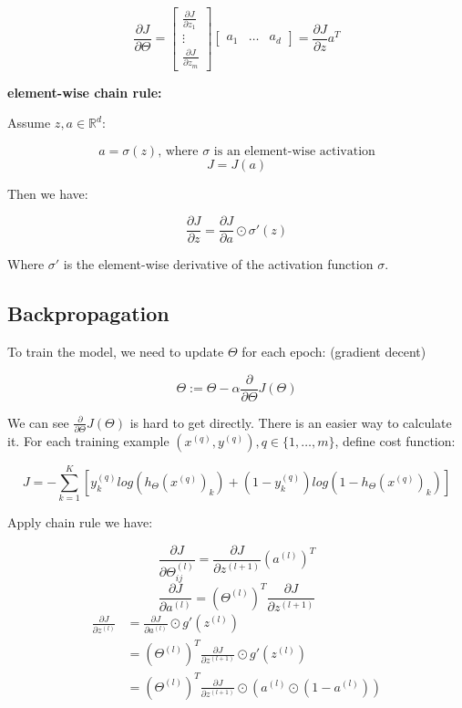 \documentclass{article}
\begin{document}
\[
\frac{\partial J}{\partial \Theta} = 
\begin{bmatrix}
\frac{\partial J}{\partial z_1}\\
\vdots\\
\frac{\partial J}{\partial z_m}
\end{bmatrix}
\begin{bmatrix}
a_1 & \dots & a_d
\end{bmatrix}
= \frac{\partial J}{\partial z} a^T
\]

\noindent \textbf{element-wise chain rule:}

\noindent Assume \(z, a \in \mathbb{R}^d\):

\[a = \sigma(z) \text{, where \(\sigma\) is an element-wise activation}\]
\[J = J(a)\]

\noindent Then we have:

\[\frac{\partial J}{\partial z} = \frac{\partial J}{\partial a} \odot \sigma'(z)\]

\noindent Where \(\sigma'\) is the element-wise derivative of the activation function \(\sigma\).

\subsection{Backpropagation}

\noindent To train the model, we need to update \(\Theta\) for each epoch: (gradient decent)

\[\Theta := \Theta - \alpha  \frac{\partial}{\partial \Theta} J(\Theta)\]

\noindent We can see \(\frac{\partial}{\partial \Theta} J(\Theta)\) is hard to get directly. There is an easier way to calculate it. For each training example \((x^{(q)}, y^{(q)}), q \in \{1, \dots, m\}\), define cost function:

\[J = -\sum_{k = 1}^{K} [y^{(q)}_k log(h_{\Theta} (x^{(q)})_k) + (1 - y^{(q)}_k) log(1 - h_{\Theta}(x^{(q)})_k)] \]

\noindent Apply chain rule we have:

\[\frac{\partial J}{\partial \Theta_{ij}^{(l)}} = \frac{\partial J}{\partial z^{(l + 1)}} (a^{(l)})^T\]
\[\frac{\partial J}{\partial a^{(l)}} = (\Theta^{(l)})^T \frac{\partial J}{\partial z^{(l + 1)}}\]
\begin{equation*}
\begin{split}
\frac{\partial J}{\partial z^{(l)}}
& = \frac{\partial J}{\partial a^{(l)}} \odot g'(z^{(l)}) \\
& = (\Theta^{(l)})^T \frac{\partial J}{\partial z^{(l + 1)}} \odot g'(z^{(l)}) \\
& = (\Theta^{(l)})^T \frac{\partial J}{\partial z^{(l + 1)}} \odot (a^{(l)} \odot (1 - a^{(l)}))
\end{split}
\end{equation*}
\end{document}
